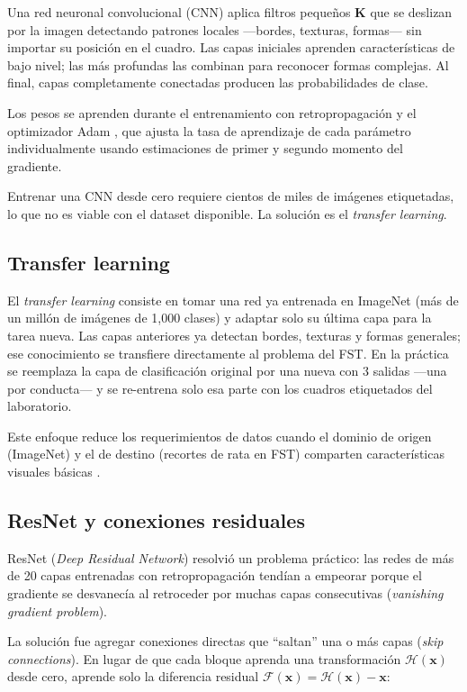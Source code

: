 Una red neuronal convolucional (CNN) \cite{lecun1998} aplica filtros pequeños
$\mathbf{K}$ que se deslizan por la imagen detectando patrones locales ---bordes,
texturas, formas--- sin importar su posición en el cuadro. Las capas iniciales aprenden
características de bajo nivel; las más profundas las combinan para reconocer formas
complejas. Al final, capas completamente conectadas producen las probabilidades de clase.

Los pesos se aprenden durante el entrenamiento con retropropagación y el optimizador
Adam \cite{kingma2014}, que ajusta la tasa de aprendizaje de cada parámetro
individualmente usando estimaciones de primer y segundo momento del gradiente.

Entrenar una CNN desde cero requiere cientos de miles de imágenes etiquetadas, lo que
no es viable con el dataset disponible. La solución es el \textit{transfer learning}.

\subsection{Transfer learning}

El \textit{transfer learning} \cite{pan2010} consiste en tomar una red ya entrenada en
ImageNet (más de un millón de imágenes de 1{,}000 clases) y adaptar solo su última capa
para la tarea nueva. Las capas anteriores ya detectan bordes, texturas y formas
generales; ese conocimiento se transfiere directamente al problema del FST. En la
práctica se reemplaza la capa de clasificación original por una nueva con 3 salidas
---una por conducta--- y se re-entrena solo esa parte con los cuadros etiquetados del
laboratorio.

Este enfoque reduce los requerimientos de datos cuando el dominio de origen (ImageNet)
y el de destino (recortes de rata en FST) comparten características visuales básicas
\cite{pan2010}.

\subsection{ResNet y conexiones residuales}

ResNet (\textit{Deep Residual Network}) \cite{he2016} resolvió un problema práctico: las
redes de más de 20 capas entrenadas con retropropagación tendían a empeorar porque el
gradiente se desvanecía al retroceder por muchas capas consecutivas
(\textit{vanishing gradient problem}).

La solución fue agregar conexiones directas que ``saltan'' una o más capas
(\textit{skip connections}). En lugar de que cada bloque aprenda una transformación
$\mathcal{H}(\mathbf{x})$ desde cero, aprende solo la diferencia residual
$\mathcal{F}(\mathbf{x}) = \mathcal{H}(\mathbf{x}) - \mathbf{x}$:

